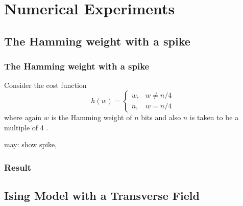 \documentclass[11pt,compress,mathserif]{beamer}
\begin{document}

\section[Examples]{Numerical Experiments}

\subsection[Spike]{The Hamming weight with a spike}

\begin{frame}\frametitle{The Hamming weight with a spike}
Consider the cost function
$$
h(w)= \begin{cases}w, & w \neq n / 4 \\ n, & w=n / 4\end{cases}
$$
where again $w$ is the Hamming weight of $n$ bits and also $n$ is taken to be a multiple of 4 .



\bit

\item may: show spike,


\eit

\end{frame}


\begin{frame}\frametitle{Result}



\end{frame}


\subsection[Ising]{Ising Model with a Transverse Field}
\end{document}

